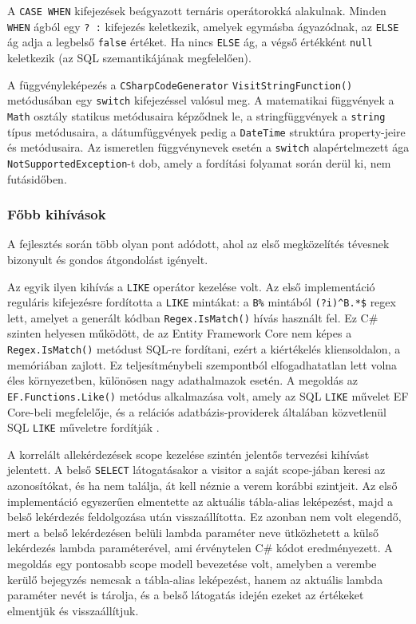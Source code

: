 \documentclass[a4paper,12pt]{article}
\begin{document}
A \texttt{CASE WHEN} kifejezések beágyazott ternáris operátorokká alakulnak. Minden \texttt{WHEN} ágból egy \texttt{? :} kifejezés keletkezik, amelyek egymásba ágyazódnak, az \texttt{ELSE} ág adja a legbelső \texttt{false} értéket. Ha nincs \texttt{ELSE} ág, a végső értékként \texttt{null} keletkezik (az SQL szemantikájának megfelelően).

A függvényleképezés a \texttt{CSharpCodeGenerator} \texttt{VisitStringFunction()} metódusában egy \texttt{switch} kifejezéssel valósul meg. A matematikai függvények a \texttt{Math} osztály statikus metódusaira képződnek le, a stringfüggvények a \texttt{string} típus metódusaira, a dátumfüggvények pedig a \texttt{DateTime} struktúra property-jeire és metódusaira. Az ismeretlen függvénynevek esetén a \texttt{switch} alapértelmezett ága \texttt{NotSupportedException}-t dob, amely a fordítási folyamat során derül ki, nem futásidőben.

\subsubsection{Főbb kihívások}

A fejlesztés során több olyan pont adódott, ahol az első megközelítés tévesnek bizonyult és gondos átgondolást igényelt.

Az egyik ilyen kihívás a \texttt{LIKE} operátor kezelése volt. Az első implementáció reguláris kifejezésre fordította a \texttt{LIKE} mintákat: a \texttt{B\%} mintából \texttt{(?i)\^{}B.*\$} regex lett, amelyet a generált kódban \texttt{Regex.IsMatch()} hívás használt fel. Ez C\# szinten helyesen működött, de az Entity Framework Core nem képes a \texttt{Regex.IsMatch()} metódust SQL-re fordítani, ezért a kiértékelés kliensoldalon, a memóriában zajlott. Ez teljesítménybeli szempontból elfogadhatatlan lett volna éles környezetben, különösen nagy adathalmazok esetén. A megoldás az \texttt{EF.Functions.Like()} metódus alkalmazása volt, amely az SQL \texttt{LIKE} művelet EF Core-beli megfelelője, és a relációs adatbázis-providerek általában közvetlenül SQL \texttt{LIKE} műveletre fordítják \cite{mslearn2024eflike}.

A korrelált allekérdezések scope kezelése szintén jelentős tervezési kihívást jelentett. A belső \texttt{SELECT} látogatásakor a visitor a saját scope-jában keresi az azonosítókat, és ha nem találja, át kell néznie a verem korábbi szintjeit. Az első implementáció egyszerűen elmentette az aktuális tábla-alias leképezést, majd a belső lekérdezés feldolgozása után visszaállította. Ez azonban nem volt elegendő, mert a belső lekérdezésen belüli lambda paraméter neve ütközhetett a külső lekérdezés lambda paraméterével, ami érvénytelen C\# kódot eredményezett. A megoldás egy pontosabb scope modell bevezetése volt, amelyben a verembe kerülő bejegyzés nemcsak a tábla-alias leképezést, hanem az aktuális lambda paraméter nevét is tárolja, és a belső látogatás idején ezeket az értékeket elmentjük és visszaállítjuk.
\end{document}
